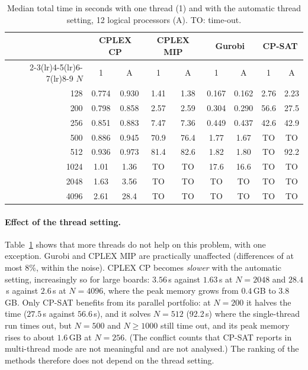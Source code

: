 \documentclass[a4paper,fleqn]{cas-sc}
\begin{document}
\begin{table}[htbp]
\centering
\caption{Median total time in seconds with one thread (1) and with the automatic thread setting, 12 logical processors (A). \textsc{TO}: time-out.}\label{tab:threads}
\small
\setlength{\tabcolsep}{4.2pt}
\begin{tabular}{r cc cc cc cc}
\toprule
 & \multicolumn{2}{c}{CPLEX CP} & \multicolumn{2}{c}{CPLEX MIP} & \multicolumn{2}{c}{Gurobi} & \multicolumn{2}{c}{CP-SAT}\\
\cmidrule(lr){2-3}\cmidrule(lr){4-5}\cmidrule(lr){6-7}\cmidrule(lr){8-9}
$N$ & 1 & A & 1 & A & 1 & A & 1 & A\\
\midrule
128 & 0.774 & 0.930 & 1.41 & 1.38 & 0.167 & 0.162 & 2.76 & 2.23\\
200 & 0.798 & 0.858 & 2.57 & 2.59 & 0.304 & 0.290 & 56.6 & 27.5\\
256 & 0.851 & 0.883 & 7.47 & 7.36 & 0.449 & 0.437 & 42.6 & 42.9\\
500 & 0.886 & 0.945 & 70.9 & 76.4 & 1.77 & 1.67 & TO & TO\\
512 & 0.936 & 0.973 & 81.4 & 82.6 & 1.82 & 1.80 & TO & 92.2\\
1024 & 1.01 & 1.36 & TO & TO & 17.6 & 16.6 & TO & TO\\
2048 & 1.63 & 3.56 & TO & TO & TO & TO & TO & TO\\
4096 & 2.61 & 28.4 & TO & TO & TO & TO & TO & TO\\
\bottomrule
\end{tabular}
\end{table}

\paragraph{Effect of the thread setting.}
Table~\ref{tab:threads} shows that more threads do not help on this problem, with one exception.
Gurobi and CPLEX MIP are practically unaffected (differences of at most $8\%$, within the noise).
CPLEX CP becomes \emph{slower} with the automatic setting, increasingly so for large boards: $3.56$\,s against $1.63$\,s at $N=2048$ and $28.4$\,s against $2.6$\,s at $N=4096$, where the peak memory grows from $0.4$\,GB to $3.8$\,GB.
Only CP-SAT benefits from its parallel portfolio: at $N=200$ it halves the time ($27.5$\,s against $56.6$\,s), and it solves $N=512$ (92.2\,s) where the single-thread run times out, but $N=500$ and $N\ge1000$ still time out, and its peak memory rises to about $1.6$\,GB at $N=256$.
(The conflict counts that CP-SAT reports in multi-thread mode are not meaningful and are not analysed.)
The ranking of the methods therefore does not depend on the thread setting.
\end{document}
